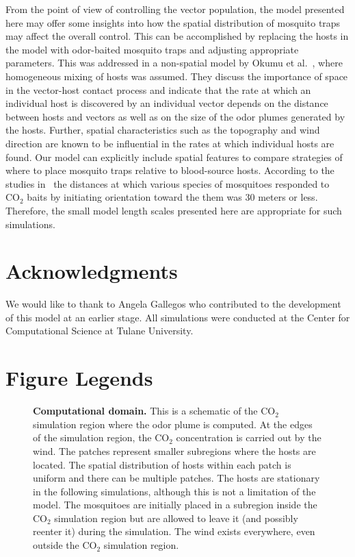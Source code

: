 \documentclass[10pt]{article}
\begin{document}
From the point of view of controlling the vector population, the model presented here may offer some insights into how the spatial distribution of mosquito traps may affect the overall control.  This can be accomplished by replacing the hosts in the model with odor-baited mosquito traps and adjusting appropriate parameters.  This was addressed in a non-spatial model by Okumu et al.~\cite{OkumuModel2010}, where homogeneous mixing of hosts was assumed.  They discuss the importance of space in the vector-host contact process and indicate that the rate at which an individual host is discovered by an individual vector depends on the distance between hosts and vectors as well as on the size of the odor plumes generated by the hosts.  Further, spatial characteristics such as the topography and wind direction are known to be influential in the rates at which individual hosts are found.  Our model can explicitly include spatial features to compare strategies of where to place mosquito traps relative to blood-source hosts.
According to the studies in~\cite{Gillies1972} the distances at which various species of mosquitoes responded to $\mbox{CO}_2$ baits by initiating orientation toward the them was 30 meters or less. Therefore, the small model length scales presented here are appropriate for such simulations.


\section*{Acknowledgments}
We would like to thank to Angela Gallegos  who contributed to the development of this model at an earlier stage. All simulations were conducted at the Center for Computational Science at Tulane University.



\newpage
\section*{Figure Legends}

\begin{center}
\begin{figure}[!htp]
\caption{
{\bf Computational domain.}  This is a schematic of the 
$\mbox{CO}_2$ simulation region where the odor plume is computed.  At the edges of the simulation 
region, the $\mbox{CO}_2$ concentration is carried out by the wind.  
The patches represent smaller subregions where the hosts are located.  The spatial distribution 
of hosts within each patch is uniform and there can be multiple patches. The hosts are stationary in the following simulations, although this is not a limitation of the model.
The mosquitoes are initially placed in a subregion inside the $\mbox{CO}_2$ simulation region but are allowed to 
leave it (and possibly reenter it) during the simulation. The wind exists everywhere, even outside the $\mbox{CO}_2$ simulation region.}
\label{fig:setup}
\end{figure}
\end{center}
\end{document}
